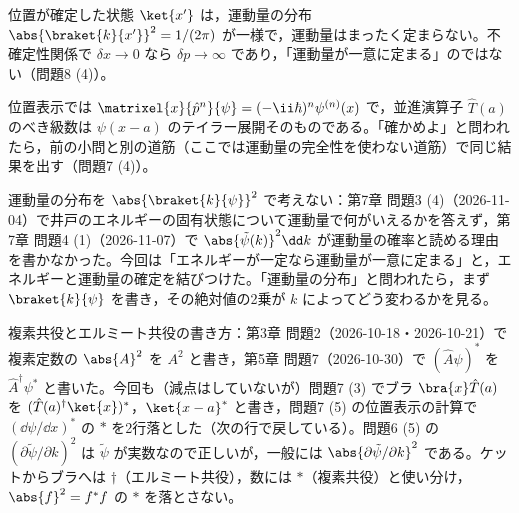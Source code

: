 \documentclass[uplatex,dvipdfmx,a4paper,11pt]{jsarticle}
\begin{document}
\matome
\begin{saitenichiran}
\end{saitenichiran}
\begin{daiji}
  \item 位置が確定した状態 $\ket{x'}$ は，運動量の分布 $\abs{\braket{k}{x'}}^{2}=1/(2\pi)$ が一様で，運動量はまったく定まらない。不確定性関係で $\delta x\to0$ なら $\delta p\to\infty$ であり，「運動量が一意に定まる」のではない（問題8 (4)）。
  \item 位置表示では $\matrixel{x}{\hat{p}^{n}}{\psi}=(-\ii\hbar)^{n}\psi^{(n)}(x)$ で，並進演算子 $\hat{T}(a)$ のべき級数は $\psi(x-a)$ のテイラー展開そのものである。「確かめよ」と問われたら，前の小問と別の道筋（ここでは運動量の完全性を使わない道筋）で同じ結果を出す（問題7 (4)）。
\end{daiji}
\begin{maemo}
  \item 運動量の分布を $\abs{\braket{k}{\psi}}^{2}$ で考えない：第7章 問題3 (4)（2026-11-04）で井戸のエネルギーの固有状態について運動量で何がいえるかを答えず，第7章 問題4 (1)（2026-11-07）で $\abs{\tilde{\psi}(k)}^{2}\dd k$ が運動量の確率と読める理由を書かなかった。今回は「エネルギーが一定なら運動量が一意に定まる」と，エネルギーと運動量の確定を結びつけた。「運動量の分布」と問われたら，まず $\braket{k}{\psi}$ を書き，その絶対値の2乗が $k$ によってどう変わるかを見る。
  \item 複素共役とエルミート共役の書き方：第3章 問題2（2026-10-18・2026-10-21）で複素定数の $\abs{A}^{2}$ を $A^{2}$ と書き，第5章 問題7（2026-10-30）で $(\hat{A}\psi)^{*}$ を $\hat{A}^{\dagger}\psi^{*}$ と書いた。今回も（減点はしていないが）問題7 (3) でブラ $\bra{x}\hat{T}(a)$ を $(\hat{T}(a)^{\dagger}\ket{x})^{*}$，$\ket{x-a}^{*}$ と書き，問題7 (5) の位置表示の計算で $(\dd\psi/\dd x)^{*}$ の $*$ を2行落とした（次の行で戻している）。問題6 (5) の $(\partial\tilde{\psi}/\partial k)^{2}$ は $\tilde{\psi}$ が実数なので正しいが，一般には $\abs{\partial\tilde{\psi}/\partial k}^{2}$ である。ケットからブラへは $\dagger$（エルミート共役），数には $*$（複素共役）と使い分け，$\abs{f}^{2}=f^{*}f$ の $*$ を落とさない。
\end{maemo}
\end{document}
